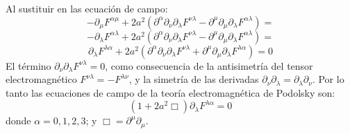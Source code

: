 \documentclass[a4paper,12pt]{article}
\begin{document}
Al sustituir en las ecuación de campo:
\begin{equation}
-\partial_{\mu}F^{\alpha\mu}+2a^2(\partial^{\alpha}\partial_{\nu}\partial_\lambda F^{\nu\lambda}-\partial^{\mu}\partial_{\mu}\partial_\lambda F^{\alpha\lambda})= 
\end{equation}
$$-\partial_{\lambda}F^{\alpha\lambda}+2a^2(\partial^{\alpha}\partial_{\nu}\partial_\lambda F^{\nu\lambda}-\partial^{\mu}\partial_{\mu}\partial_\lambda F^{\alpha\lambda})= $$
$$\partial_{\lambda}F^{\lambda\alpha}+2a^2(\partial^{\alpha}\partial_{\nu}\partial_\lambda F^{\nu\lambda}+\partial^{\mu}\partial_{\mu}\partial_\lambda F^{\lambda\alpha})=0$$
El término \mbox{$\partial_{\nu}\partial_\lambda F^{\nu\lambda}=0$}, como consecuencia de la antisimetría del tensor \mbox{electromagnético} \mbox{$F^{\nu\lambda}=-F^{\lambda\nu}$}, y la simetría de las derivadas \mbox{$\partial_{\nu}\partial_\lambda=\partial_{\lambda}\partial_\nu$}. Por lo tanto las ecuaciones de campo de la teoría electromagnética de Podolsky son:
\begin{equation}
(1+2a^2\Box)\partial_{\lambda}F^{\lambda\alpha}=0
\end{equation}
donde $\alpha=0,1,2,3$; y $\Box=\partial^{\mu}\partial_{\mu}$. 
\vspace{0,4cm}

\\
\end{document}
